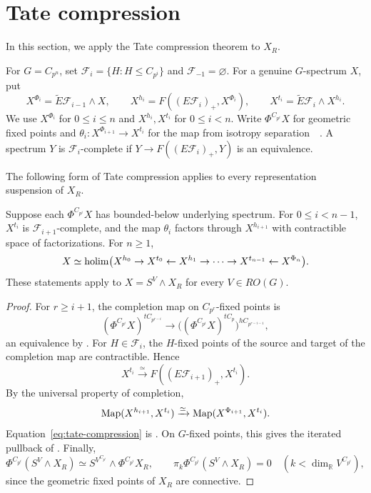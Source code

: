 \section{Tate compression}\label{sec:compression}

In this section, we apply the Tate compression theorem to $X_R$. 

For $G=C_{p^n}$, set
$\mathcal F_i=\{H:H\le C_{p^i}\}$ and
$\mathcal F_{-1}=\varnothing$. For a genuine $G$-spectrum $X$, put
\[
X^{\Phi_i}=\widetilde E\mathcal F_{i-1}\wedge X,\qquad
X^{h_i}=F((E\mathcal F_i)_+,X^{\Phi_i}),\qquad
X^{t_i}=\widetilde E\mathcal F_i\wedge X^{h_i}.
\]
We use $X^{\Phi_i}$ for $0\le i\le n$ and $X^{h_i},X^{t_i}$ for $0\le i<n$.
Write $\Phi^{C_{p^i}}X$ for geometric fixed points and
$\theta_i:X^{\Phi_{i+1}}\to X^{t_i}$ for the map from isotropy separation~\cite[Section~17]{GreenleesMay}~\cite[Section~2.2]{AMR}.
A spectrum $Y$ is $\mathcal F_i$-complete if
$Y\to F((E\mathcal F_i)_+,Y)$ is an equivalence.

The following form of Tate compression applies to every representation
suspension of $X_R$.

\begin{proposition}\label{prop:compression}
Suppose each $\Phi^{C_{p^i}}X$ has bounded-below underlying spectrum.
For $0\le i<n-1$, $X^{t_i}$ is $\mathcal F_{i+1}$-complete, and
the map $\theta_i$ factors through
$X^{h_{i+1}}$ with contractible space of factorizations.
For $n\ge1$,
\begin{equation}\label{eq:tate-compression}
X\simeq\operatorname*{holim}\bigl(
X^{h_0}\to X^{t_0}\leftarrow X^{h_1}
\to\cdots\to X^{t_{n-1}}\leftarrow X^{\Phi_n}\bigr).
\end{equation}
These statements apply to $X=S^V\wedge X_R$ for every $V\in RO(G)$.
\end{proposition}

\begin{proof}
For $r\ge i+1$, the completion map on $C_{p^r}$-fixed points is
\[
(\Phi^{C_{p^i}}X)^{tC_{p^{r-i}}}
\longrightarrow
\bigl((\Phi^{C_{p^i}}X)^{tC_p}\bigr)^{hC_{p^{r-i-1}}},
\]
an equivalence by \cite[Lemma~II.4.1]{NS}.
For $H\in\mathcal F_i$, the $H$-fixed points of the source and target
of the completion map are contractible. Hence
\[
X^{t_i}\xrightarrow{\simeq}
F((E\mathcal F_{i+1})_+,X^{t_i}).
\]
By the universal property of completion,
\[
\operatorname{Map}(X^{h_{i+1}},X^{t_i})\xrightarrow{\simeq}
\operatorname{Map}(X^{\Phi_{i+1}},X^{t_i}).
\]
Equation~\eqref{eq:tate-compression} is
\cite[Theorem~4.7]{ZhangHZ}.
On $G$-fixed points, this gives the iterated pullback of
\cite[Corollary~II.4.7 and Remark~II.4.8]{NS}.
Finally,
\[
\Phi^{C_{p^i}}(S^V\wedge X_R)
\simeq S^{V^{C_{p^i}}}\wedge\Phi^{C_{p^i}}X_R,
\qquad
\pi_k\Phi^{C_{p^i}}(S^V\wedge X_R)=0
\quad(k<\dim_{\mathbb R}V^{C_{p^i}}),
\]
since the geometric fixed points of $X_R$ are connective.
\end{proof}

